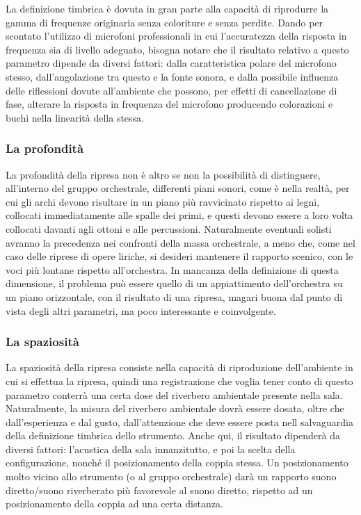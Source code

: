 La definizione timbrica è dovuta in gran parte alla capacità di riprodurre la
gamma di frequenze originaria senza coloriture e senza perdite. Dando per
scontato l’utilizzo di microfoni professionali in cui l’accuratezza della
risposta in frequenza sia di livello adeguato, bisogna notare che il risultato
relativo a questo parametro dipende da diversi fattori: dalla caratteristica
polare del microfono stesso, dall’angolazione tra questo e la fonte sonora, e
dalla possibile influenza delle riflessioni dovute all’ambiente che possono, per
effetti di cancellazione di fase, alterare la risposta in frequenza del microfono
producendo colorazioni e buchi nella linearità della stessa.

\subsubsection*{La profondità}

La profondità della ripresa non è altro se non la possibilità di distinguere,
all’interno del gruppo orchestrale, differenti piani sonori, come è nella realtà,
per cui gli archi devono risultare in un piano più ravvicinato rispetto ai legni,
collocati immediatamente alle spalle dei primi, e questi devono essere a loro
volta collocati davanti agli ottoni e alle percussioni. Naturalmente eventuali
solisti avranno la precedenza nei confronti della massa orchestrale, a meno che,
come nel caso delle riprese di opere liriche, si desideri mantenere il rapporto
scenico, con le voci più lontane rispetto all’orchestra. In mancanza della
definizione di questa dimensione, il problema può essere quello di un appiattimento
dell’orchestra su un piano orizzontale, con il risultato di una ripresa, magari
buona dal punto di vista degli altri parametri, ma poco interessante e coinvolgente.

\subsubsection*{La spaziosità}

La spaziosità della ripresa consiste nella capacità di riproduzione dell’ambiente
in cui si effettua la ripresa, quindi una registrazione che voglia tener conto
di questo parametro conterrà una certa dose del riverbero ambientale presente
nella sala. Naturalmente, la misura del riverbero ambientale dovrà essere dosata,
oltre che dall’esperienza e dal gusto, dall’attenzione che deve essere posta nell
salvaguardia della definizione timbrica dello strumento. Anche qui, il risultato
dipenderà da diversi fattori: l’acustica della sala innanzitutto, e poi la scelta
della configurazione, nonché il posizionamento della coppia stessa. Un
posizionamento molto vicino allo strumento (o al gruppo orchestrale) darà un
rapporto suono diretto/suono riverberato più favorevole al suono diretto, rispetto
ad un posizionamento della coppia ad una certa distanza.
